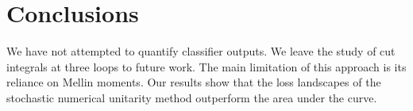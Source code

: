 \section{Conclusions}\label{sec:conclusions}

We have not attempted to quantify classifier outputs. We leave the study
of cut integrals at three loops to future work. The main limitation of
this approach is its reliance on Mellin moments. Our results show that
the loss landscapes of the stochastic numerical unitarity method
outperform the area under the curve.

